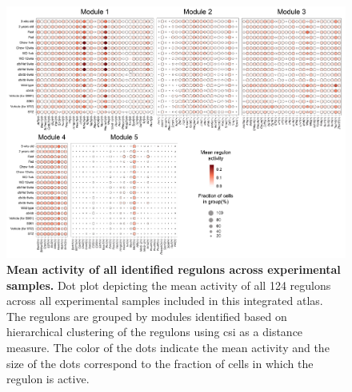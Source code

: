\begin{figure}[H]
\centering
\includegraphics[width=\linewidth]{Appendix2/Fig/F3-15-01.png}
\caption[Mean activity of all identified regulons across experimental samples]{\textbf{Mean activity of all identified regulons across experimental samples.} Dot plot depicting the mean activity of all 124 regulons across all experimental samples included in this integrated atlas. The regulons are grouped by modules identified based on hierarchical clustering of the regulons using \gls{csi} as a distance measure. The color of the dots indicate the mean activity and the size of the dots correspond to the fraction of cells in which the regulon is active.}
\label{fig:app_chp3_scenic_studies}
\end{figure}

